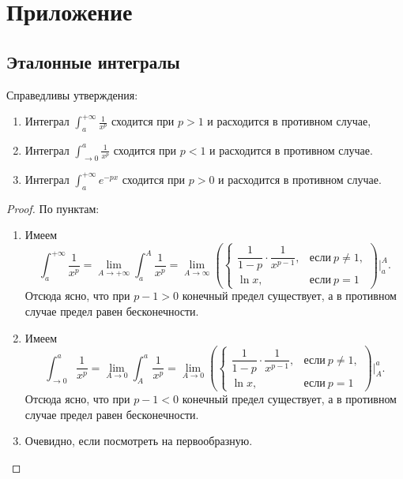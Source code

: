 \section{Приложение}

\subsection{Эталонные интегралы}

\begin{lemma} \hypertarget{etint}{}
	Справедливы утверждения:
	\begin{enumerate}
		\item Интеграл \(\displaystyle \int_a^{+\infty} \frac{1}{x^p}\) сходится при \(p > 1\) и расходится в противном случае,
		\item Интеграл \(\displaystyle \int_{\to 0}^a \frac{1}{x^p}\) сходится при \(p < 1\) и расходится в противном случае.
		\item Интеграл \(\displaystyle \int_a^{+\infty} e^{-p x}\) сходится при \(p > 0\) и расходится в противном случае.
	\end{enumerate}
	
\end{lemma}
\begin{proof}
	По пунктам:
	\begin{enumerate}
		\item Имеем \[
		\int_a^{+\infty} \frac{1}{x^p} = \lim_{A \to +\infty} \int_a^A \frac{1}{x^p} = \lim_{A 	\to \infty} \left(
		\begin{cases}
			\dfrac{1}{1 - p} \cdot \dfrac{1}{x^{p - 1}}, &\text{если} \ p \neq 1, \\
			\ln x, 									   &\text{если} \ p = 1
		\end{cases}
		\right) \bigg|_a^A.
		\]
		Отсюда ясно, что при \(p - 1 > 0\) конечный предел существует, а в противном случае предел равен бесконечности.
		\item Имеем \[
		\int_{\to 0}^a \frac{1}{x^p} = \lim_{A \to 0} \int_A^a \frac{1}{x^p} = \lim_{A 	\to 0} \left(
		\begin{cases}
			\dfrac{1}{1 - p} \cdot \dfrac{1}{x^{p - 1}}, &\text{если} \ p \neq 1, \\
			\ln x, 									   &\text{если} \ p = 1
		\end{cases}
		\right) \bigg|_A^a.
		\]
		Отсюда ясно, что при \(p - 1 < 0\) конечный предел существует, а в противном случае предел равен бесконечности.
		\item Очевидно, если посмотреть на первообразную.
	\end{enumerate}
\end{proof}

